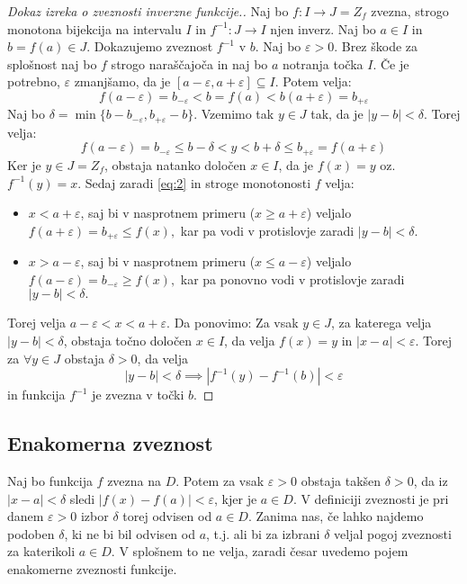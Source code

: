 \documentclass[10pt, a4paper]{article}
\newenvironment{noticeC}{%
  \tcolorbox[%
  notitle,
  empty,
  enhanced,  %
  breakable,
  coltext=black, 
  fontupper=\rmfamily,
  parbox=false,
  noparskip,
  sharp corners,
  boxrule=-1pt,  %
  frame hidden,
  left=7pt,  %
  right=7pt,
  top=5pt,
  bottom=5pt,
  before skip=2.5ex plus 2pt,
  after skip=2.5ex plus 2pt,
  overlay unbroken and last={%
  },
  ]}
{\endtcolorbox}
\newenvironment{dokaz}%
  {\begin{noticeC}\begin{proof}}%
  {\end{proof}\end{noticeC}}
\begin{document}
\begin{dokaz}[Dokaz izreka o zveznosti inverzne funkcije.]
    Naj bo $f: I \rightarrow J = Z_f$ zvezna, strogo monotona bijekcija na intervalu $I$ in 
    $f^{-1} : J \rightarrow I$ njen inverz. Naj bo $a \in I$ in $b = f(a) \in J$. Dokazujemo zveznost $f^{-1}$ v $b$.
    Naj bo $\varepsilon>0$. Brez škode za splošnost naj bo $f$ strogo naraščajoča in naj bo $a$ notranja točka $I$. Če je potrebno, $\varepsilon$
    zmanjšamo, da je $[a - \varepsilon, a+ \varepsilon] \subseteq I.$ Potem velja:
    $$f(a-\varepsilon) = b_{-\varepsilon} < b = f(a) < b(a+\varepsilon) = b_{+\varepsilon}$$
    Naj bo $\delta = \min\{b-b_{-\varepsilon}, b_{+\varepsilon}-b\}$. Vzemimo tak $y \in J$ tak, da je $|y-b| < \delta.$ Torej velja:
    \begin{equation}
        \label{eq:2} \tag{$*$} f(a-\varepsilon) = b_{-\varepsilon} \leq b-\delta < y < b + \delta \leq b_{+\varepsilon} = f(a+\varepsilon)
    \end{equation}
    Ker je $y \in J = Z_f$, obstaja natanko določen $x \in I$, da je $f(x) = y$ oz. $f^{-1} (y) = x.$ 
    Sedaj zaradi \eqref{eq:2} in stroge monotonosti $f$ velja:
    \begin{itemize}
        \item $x< a+\varepsilon$, saj bi v nasprotnem primeru ($x \geq a + \varepsilon$) veljalo $f(a+\varepsilon) = b_{+\varepsilon} \leq f(x),$ kar pa vodi v protislovje zaradi $|y-b|<\delta.$
        \item $x > a-\varepsilon$, saj bi v nasprotnem primeru ($x \leq a - \varepsilon$) veljalo $f(a-\varepsilon) = b_{-\varepsilon} \geq f(x),$ kar pa ponovno vodi v protislovje zaradi $|y-b|<\delta.$
    \end{itemize}
    Torej velja $a-\varepsilon < x < a+\varepsilon$.
    Da ponovimo: Za vsak $y \in J$, za katerega velja $|y-b| < \delta$, obstaja točno določen $x \in I$, da velja
    $f(x) = y$ in $|x-a| < \varepsilon.$ Torej za $\forall y \in J$ obstaja $\delta>0$, da velja
    $$|y-b| < \delta \implies |f^{-1} (y) - f^{-1} (b)| < \varepsilon$$ in funkcija $f^{-1}$ je zvezna v točki $b$.
\end{dokaz}

\subsection{Enakomerna zveznost}

Naj bo funkcija $f$ zvezna na $D$. 
Potem za vsak $\varepsilon > 0$ obstaja takšen $\delta>0$, da iz $|x-a| < \delta$ sledi $|f(x)-f(a)| < \varepsilon$, kjer je $a \in D$. 
V definiciji zveznosti je pri danem $\varepsilon>0$ izbor $\delta$ torej odvisen od $a \in D$. 
Zanima nas, če lahko najdemo podoben $\delta$, ki ne bi bil odvisen od $a$, t.j. ali bi za izbrani $\delta$ veljal pogoj zveznosti za katerikoli $a \in D$.
V splošnem to ne velja, zaradi česar uvedemo pojem enakomerne zveznosti funkcije.
\end{document}
